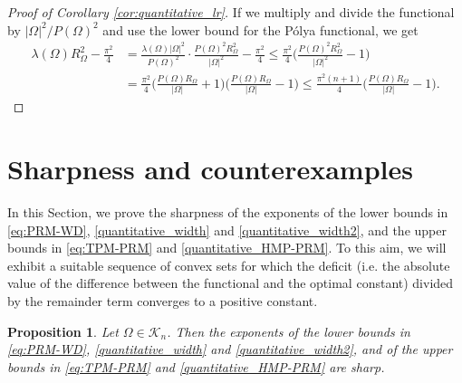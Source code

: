 \documentclass[oneside,a4paper,11pt,notitlepage]{article}
\newcommand{\abs}[1]{{\left|#1\right|}}
\theoremstyle{definition}
\theoremstyle{plain}
\newtheorem{prop}[teorema]{Proposition}
\theoremstyle{definition}
\begin{document}
\begin{proof}[Proof of Corollary \ref{cor:quantitative_lr}]
If we multiply and divide the functional by $\abs{\Omega}^2/P(\Omega)^2$ and use the lower bound for the P\'olya functional, we get
\begin{equation*}
\begin{split}
\lambda(\Omega)R_\Omega^2 - \frac{\pi^2}{4}&= \frac{\lambda(\Omega)\abs{\Omega}^2}{ P(\Omega)^2} \cdot\frac{P(\Omega)^2R_\Omega^2 }{\abs{\Omega}^2} - \frac{\pi^2}{4}\le \frac{\pi^2}{4}\bigg(\frac{P(\Omega)^2R_\Omega^2 }{\abs{\Omega}^2}-1\bigg)\\
    &= \frac{\pi^2}{4}\bigg(\frac{P(\Omega)R_\Omega }{\abs{\Omega}}+1\bigg)\bigg(\frac{P(\Omega)R_\Omega }{\abs{\Omega}}-1\bigg)\le \frac{\pi^2(n+1)}{4}\bigg(\frac{P(\Omega)R_\Omega}{\abs{\Omega}}-1\bigg).
        \end{split}
\end{equation*}
\end{proof}


\section{Sharpness and counterexamples}\label{Sec:sharpnessandcounterexamples}
In this Section, we prove the sharpness of the exponents of the lower bounds in \eqref{eq:PRM-WD},   %
\eqref{quantitative_width} and  \eqref{quantitative_width2},  and the upper bounds in \eqref{eq:TPM-PRM} and \eqref{quantitative_HMP-PRM}.%
To this aim, we will exhibit a suitable sequence of convex sets for which the deficit (i.e. the absolute value of the difference between the functional and the optimal constant)  divided by the remainder term converges to a positive constant.  %




\begin{prop}\label{prop:sharpnessexponent}   Let $\Omega\in \mathcal{K}_n$. Then the exponents of the lower bounds in \eqref{eq:PRM-WD}, 
\eqref{quantitative_width} and  \eqref{quantitative_width2},  and of the upper bounds in \eqref{eq:TPM-PRM} and  \eqref{quantitative_HMP-PRM}
    are sharp.  
\end{prop}
\end{document}
